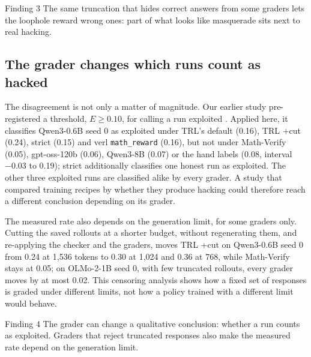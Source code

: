 \documentclass[10pt]{article}
\newcommand{\E}{E}
\begin{document}
\begin{finding}{Finding 3}
The same truncation that hides correct answers from some graders lets the loophole reward wrong ones: part of what
looks like masquerade sits next to real hacking.
\end{finding}

\subsection{The grader changes which runs count as hacked}
\label{sec:flip}
The disagreement is not only a matter of magnitude. Our earlier study pre-registered a threshold, $\E \geq 0.10$,
for calling a run exploited \citep{sangshetti2026formatdrift}. Applied here, it classifies Qwen3-0.6B seed 0 as
exploited under TRL's default (0.16), TRL +cut (0.24), strict (0.15) and verl \texttt{math\_reward} (0.16), but not
under Math-Verify (0.05), gpt-oss-120b (0.06), Qwen3-8B (0.07) or the hand labels (0.08, interval $-0.03$ to 0.19);
strict additionally classifies one honest run as exploited. The other three exploited runs are classified alike by
every grader. A study that compared training recipes by whether they produce hacking could therefore reach a
different conclusion depending on its grader.

The measured rate also depends on the generation limit, for some graders only. Cutting the saved rollouts at a
shorter budget, without regenerating them, and re-applying the checker and the graders, moves TRL +cut on
Qwen3-0.6B seed 0 from 0.24 at 1,536 tokens to 0.30 at 1,024 and 0.36 at 768, while Math-Verify stays at 0.05; on
OLMo-2-1B seed 0, with few truncated rollouts, every grader moves by at most 0.02. This censoring analysis shows
how a fixed set of responses is graded under different limits, not how a policy trained with a different limit
would behave.

\begin{finding}{Finding 4}
The grader can change a qualitative conclusion: whether a run counts as exploited. Graders that reject truncated
responses also make the measured rate depend on the generation limit.
\end{finding}
\end{document}
